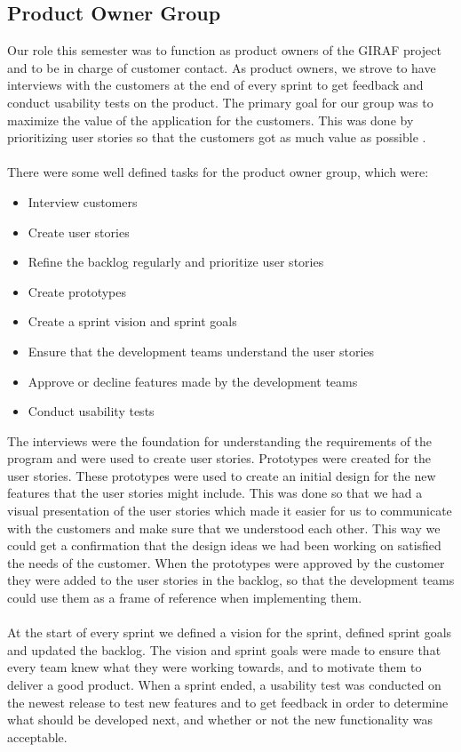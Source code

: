 \subsection{Product Owner Group}
Our role this semester was to function as product owners of the GIRAF project and to be in charge of customer contact. 
As product owners, we strove to have interviews with the customers at the end of every sprint to get feedback and conduct usability tests on the product.
The primary goal for our group was to maximize the value of the application for the customers. 
This was done by prioritizing user stories so that the customers got as much value as possible \autocite{TheScrumGuide}.\\
\\
There were some well defined tasks for the product owner group, which were:
\begin{itemize}
    \item Interview customers
    \item Create user stories    
    \item Refine the backlog regularly and prioritize user stories
    \item Create prototypes
    \item Create a sprint vision and sprint goals
    \item Ensure that the development teams understand the user stories
    \item Approve or decline features made by the development teams
    \item Conduct usability tests
\end{itemize}
\noindent
The interviews were the foundation for understanding the requirements of the program and were used to create user stories. 
Prototypes were created for the user stories.
These prototypes were used to create an initial design for the new features that the user stories might include. 
This was done so that we had a visual presentation of the user stories which made it easier for us to communicate with the customers and make sure that we understood each other. 
This way we could get a confirmation that the design ideas we had been working on satisfied the needs of the customer.
When the prototypes were approved by the customer they were added to the user stories in the backlog, so that the development teams could use them as a frame of reference when implementing them.
\\\\
At the start of every sprint we defined a vision for the sprint, defined sprint goals and updated the backlog. 
The vision and sprint goals were made to ensure that every team knew what they were working towards, and to motivate them to deliver a good product.
When a sprint ended, a usability test was conducted on the newest release to test new features and to get feedback in order to determine what should be developed next, and whether or not the new functionality was acceptable.


